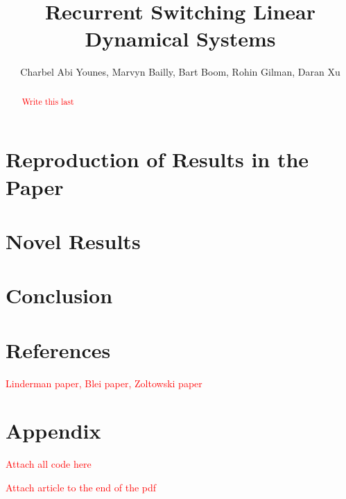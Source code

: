 \documentclass{amsart}
\title{Recurrent Switching Linear Dynamical Systems}
\author{Charbel Abi Younes, Marvyn Bailly, Bart Boom, Rohin Gilman, Daran Xu}
\date{}
\begin{document}
\begin{abstract}
	\textcolor{red}{Write this last}
\end{abstract}

\maketitle


%

\section{Reproduction of Results in the Paper}

\section{Novel Results}

\section{Conclusion}

\section{References}

\textcolor{red}{Linderman paper, Blei paper, Zoltowski paper}

\section{Appendix}

\textcolor{red}{Attach all code here}

\textcolor{red}{Attach article to the end of the pdf}
\end{document}
